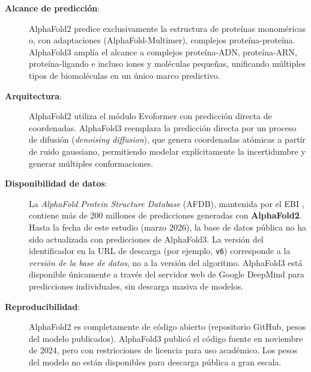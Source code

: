 \begin{description}
    \item[\textbf{Alcance de predicci\'on}:]
    AlphaFold2 predice exclusivamente la estructura de prote\'inas monoméricas o, con
    adaptaciones (AlphaFold-Multimer), complejos prote\'ina-prote\'ina. AlphaFold3 ampl\'ia
    el alcance a complejos prote\'ina-ADN, prote\'ina-ARN, prote\'ina-ligando e incluso
    iones y mol\'eculas peque\~nas, unificando m\'ultiples tipos de biomol\'eculas en un
    \'unico marco predictivo.

    \item[\textbf{Arquitectura}:]
    AlphaFold2 utiliza el m\'odulo Evoformer con predicci\'on directa de coordenadas.
    AlphaFold3 reemplaza la predicci\'on directa por un proceso de difusi\'on
    (\textit{denoising diffusion}), que genera coordenadas at\'omicas a partir de ruido
    gaussiano, permitiendo modelar expl\'icitamente la incertidumbre y generar m\'ultiples
    conformaciones.

    \item[\textbf{Disponibilidad de datos}:]
    La \textit{AlphaFold Protein Structure Database} (AFDB), mantenida por el EBI
    \citep{varadi2022alphafold}, contiene m\'as de 200 millones de predicciones generadas
    con \textbf{AlphaFold2}. Hasta la fecha de este estudio (marzo 2026), la base de datos
    p\'ublica no ha sido actualizada con predicciones de AlphaFold3. La versi\'on del
    identificador en la URL de descarga (por ejemplo, \texttt{v6}) corresponde a la
    \emph{versi\'on de la base de datos}, no a la versi\'on del algoritmo.
    AlphaFold3 est\'a disponible \'unicamente a trav\'es del servidor web de Google DeepMind
    para predicciones individuales, sin descarga masiva de modelos.

    \item[\textbf{Reproducibilidad}:]
    AlphaFold2 es completamente de c\'odigo abierto (repositorio GitHub, pesos del modelo
    publicados). AlphaFold3 public\'o el c\'odigo fuente en noviembre de 2024, pero con
    restricciones de licencia para uso acad\'emico. Los pesos del modelo no est\'an
    disponibles para descarga p\'ublica a gran escala.
\end{description}

